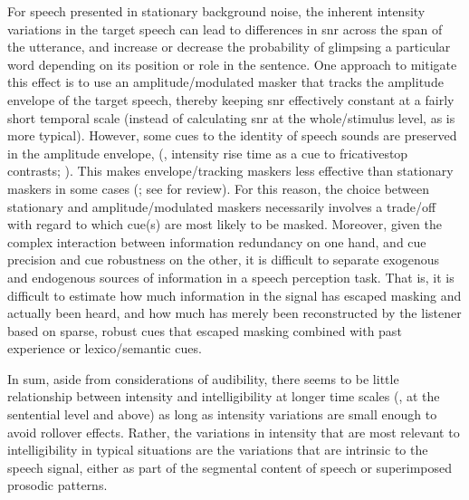 For speech presented in stationary background noise, the inherent intensity variations in the target speech can lead to differences in \ac{snr} across the span of the utterance, and increase or decrease the probability of glimpsing a particular word depending on its position or role in the sentence.  One approach to mitigate this effect is to use an amplitude\-/modulated masker that tracks the amplitude envelope of the target speech, thereby keeping \ac{snr} effectively constant at a fairly short temporal scale (instead of calculating \ac{snr} at the whole\-/stimulus level, as is more typical).  However, some cues to the identity of speech sounds are preserved in the amplitude envelope, (\eg, intensity rise time as a cue to fricative\slsh stop contrasts; \citealt{ShinnBlumstein1984}).  This makes envelope\-/tracking maskers less effective than stationary maskers in some cases (\citealt{HoriiEtAl1971, VanTasellEtAl1987, BashfordEtAl1996}; see \citealt{Wright2004b} for review).  For this reason, the choice between stationary and amplitude\-/modulated maskers necessarily involves a trade\-/off with regard to which cue(s) are most likely to be masked.  Moreover, given the complex interaction between information redundancy on one hand, and cue precision and cue robustness on the other, it is difficult to separate exogenous and endogenous sources of information in a speech perception task.  That is, it is difficult to estimate how much information in the signal has escaped masking and actually been heard, and how much has merely been reconstructed by the listener based on sparse, robust cues that escaped masking combined with past experience or lexico\-/semantic cues.

In sum, aside from considerations of audibility, there seems to be little relationship between intensity and intelligibility at longer time scales (\ie, at the sentential level and above) as long as intensity variations are small enough to avoid rollover effects.  Rather, the variations in intensity that are most relevant to intelligibility in typical situations are the variations that are intrinsic to the speech signal, either as part of the segmental content of speech or superimposed prosodic patterns.

